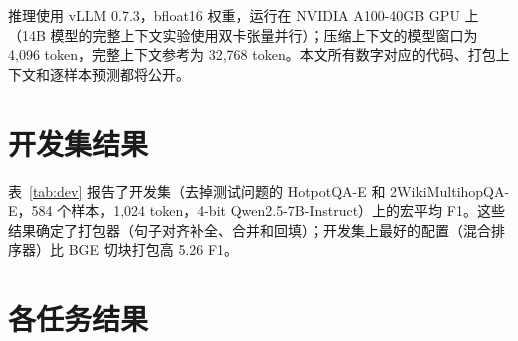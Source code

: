 \documentclass[11pt]{article}
\begin{document}
推理使用 vLLM 0.7.3，bfloat16 权重，运行在 NVIDIA A100-40GB GPU 上（14B 模型的完整上下文实验使用双卡张量并行）；压缩上下文的模型窗口为 4,096 token，完整上下文参考为 32,768 token。本文所有数字对应的代码、打包上下文和逐样本预测都将公开。

\section{开发集结果}
\label{app:dev}
表~\ref{tab:dev} 报告了开发集（去掉测试问题的 HotpotQA-E 和 2WikiMultihopQA-E，584 个样本，1,024 token，4-bit Qwen2.5-7B-Instruct）上的宏平均 F1。这些结果确定了打包器（句子对齐补全、合并和回填）；开发集上最好的配置（混合排序器）比 BGE 切块打包高 5.26 F1。

\begin{table}[h]
\centering
\small
{}
\caption{开发集宏平均 F1（1,024 token）。}
\label{tab:dev}
\end{table}

\section{各任务结果}
\label{app:pertask}
\end{document}
